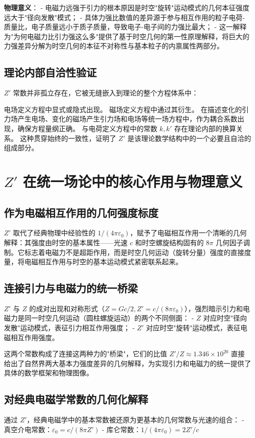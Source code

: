 \documentclass[a4paper,12pt]{article}
\theoremstyle{plain}
\begin{document}
\textbf{物理意义}：
- 电磁力远强于引力的根本原因是时空"旋转"运动模式的几何本征强度远大于"径向发散"模式；
- 具体力强比数值的差异源于参与相互作用的粒子电荷-质量比，电子质量远小于质子质量，导致电子-电子间的力强比最大；
- 这一解释为"为何电磁力比引力强这么多"提供了基于时空几何的第一性原理解释，将巨大的力强差异分解为时空几何的本征不对称性与基本粒子的内禀属性两部分。

\subsection{理论内部自洽性验证}
$Z'$ 常数并非孤立存在，它被无缝嵌入到理论的整个方程体系中：

电场定义方程中显式或隐式出现。
磁场定义方程中通过其衍生。
在描述变化的引力场产生电场、变化的磁场产生引力场和电场等统一场方程中，作为耦合系数出现，确保方程量纲正确。
与电荷定义方程中的常数 $k, k'$ 存在理论内部的换算关系。
这种贯穿始终的一致性，证明了 $Z'$ 是该理论数学结构中的一个必要且自洽的组成部分。

\section{$Z'$ 在统一场论中的核心作用与物理意义}

\subsection{作为电磁相互作用的几何强度标度}
$Z'$ 取代了经典物理中经验性的 $1/(4\pi\varepsilon_0)$，赋予了电磁相互作用一个清晰的几何解释：其强度由时空的基本属性——光速 $c$ 和时空螺旋结构固有的 $8\pi$ 几何因子调制。它标志着电磁力不是超距作用，而是时空几何运动（旋转分量）强度的直接度量，将电磁相互作用与时空的基本运动模式紧密联系起来。

\subsection{连接引力与电磁力的统一桥梁}
$Z'$ 与 $Z$ 的成对出现和对称形式（$Z = Gc/2, Z' = c/(8\pi\varepsilon_0)$），强烈暗示引力和电磁力是同一时空几何运动（圆柱螺旋运动）的两个不同侧面：
- $Z$ 对应时空"径向发散"运动模式，表征引力相互作用强度；
- $Z'$ 对应时空"旋转"运动模式，表征电磁相互作用强度。

这两个常数构成了连接这两种力的"桥梁"，它们的比值 $Z'/Z \approx 1.346\times10^{20}$ 直接给出了自然界两大基本力强度差异的几何解释，为实现引力和电磁力的统一提供了具体的数学框架和物理图像。

\subsection{对经典电磁学常数的几何化解释}
通过 $Z'$，经典电磁学中的基本常数被还原为更基本的几何常数与光速的组合：
- 真空介电常数：$\varepsilon_0 = c / (8\pi Z')$
- 库仑常数：$1/(4\pi\varepsilon_0) = 2Z'/c$
\end{document}
